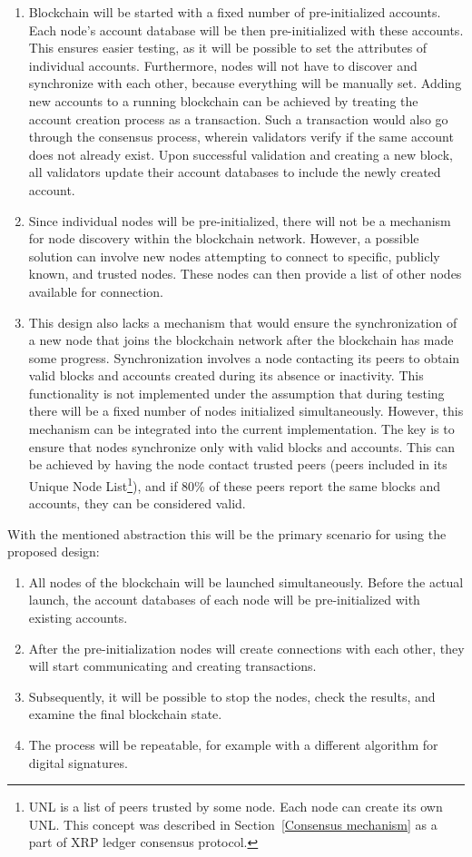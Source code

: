 \begin{enumerate}
    \item Blockchain will be started with a fixed number of pre-initialized accounts. Each node's account database will be then pre-initialized with these accounts. This ensures easier testing, as it will be possible to set the attributes of individual accounts. Furthermore, nodes will not have to discover and synchronize with each other, because everything will be manually set. Adding new accounts to a running blockchain can be achieved by treating the account creation process as a transaction. Such a transaction would also go through the consensus process, wherein validators verify if the same account does not already exist. Upon successful validation and creating a new block, all validators update their account databases to include the newly created account.
    \item Since individual nodes will be pre-initialized, there will not be a mechanism for node discovery within the blockchain network. However, a possible solution can involve new nodes attempting to connect to specific, publicly known, and trusted nodes. These nodes can then provide a list of other nodes available for connection.
    \item This design also lacks a mechanism that would ensure the synchronization of a new node that joins the blockchain network after the blockchain has made some progress. Synchronization involves a node contacting its peers to obtain valid blocks and accounts created during its absence or inactivity. This functionality is not implemented under the assumption that during testing there will be a fixed number of nodes initialized simultaneously. However, this mechanism can be integrated into the current implementation. The key is to ensure that nodes synchronize only with valid blocks and accounts. This can be achieved by having the node contact trusted peers (peers included in its Unique Node List\footnote{UNL is a list of peers trusted by some node. Each node can create its own UNL. This concept was described in Section~\ref{Consensus mechanism} as a part of XRP ledger consensus protocol.}), and if 80\% of these peers report the same blocks and accounts, they can be considered valid.
\end{enumerate}

With the mentioned abstraction this will be the primary scenario for using the proposed design:
\begin{enumerate}
    \item All nodes of the blockchain will be launched simultaneously. Before the actual launch, the account databases of each node will be pre-initialized with existing accounts.
    \item After the pre-initialization nodes will create connections with each other, they will start communicating and creating transactions.
    \item Subsequently, it will be possible to stop the nodes, check the results, and examine the final blockchain state.
    \item The process will be repeatable, for example with a different algorithm for digital signatures.
\end{enumerate}

